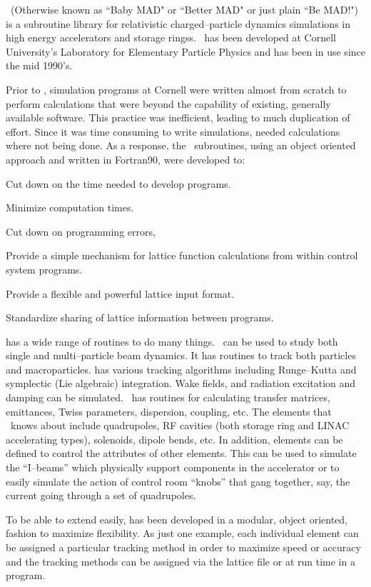 
\bmad\ (Otherwise known as ``Baby MAD" or ``Better MAD" or just plain
``Be MAD!")  is a subroutine library for relativistic
charged--particle dynamics simulations in high energy accelerators and
storage ringss. \bmad\ has been developed at Cornell University's
Laboratory for Elementary Particle Physics and has been in use since
the mid 1990's. 

Prior to \bmad, simulation programs at Cornell were written almost from 
scratch to perform
calculations that were beyond the capability of existing, generally
available software. This practice was inefficient, leading to much
duplication of effort.  Since it was time consuming to write
simulations, needed calculations where not being done.  As a response,
the \bmad\ subroutines, using an object oriented approach and written
in Fortran90, were developed to:
\begin{Itemize}
\item Cut down on the time needed to develop programs.
\item Minimize computation times.
\item Cut down on programming errors, 
\item Provide a simple mechanism for lattice function calculations
from within control system programs.
\item Provide a flexible and powerful lattice input format.
\item Standardize sharing of lattice information between 
programs.
\end{Itemize}

\bmad has a wide range of routines to do many things.  \bmad\ can be
used to study both single and multi--particle beam dynamics.  It has
routines to track both particles and macroparticles. \bmad has various
tracking algorithms including Runge--Kutta and symplectic (Lie
algebraic) integration.  Wake fields, and radiation excitation and
damping can be simulated. \bmad\ has routines for calculating transfer
matrices, emittances, Twiss parameters, dispersion, coupling, etc. The
elements that \bmad\ knows about include quadrupoles, RF cavities
(both storage ring and LINAC accelerating types), solenoids, dipole
bends, etc. In addition, elements can be defined to control the
attributes of other elements. This can be used to simulate the
``I--beams'' which physically support components in the accelerator
 or to easily simulate the action of control room ``knobs''
that gang together, say, the current going through a set of quadrupoles.

To be able to extend \bmad easily, \bmad has been developed
in a modular, object oriented, fashion to maximize flexibility. As just one 
example, each individual element can be assigned a particular tracking method
in order to maximize speed or accuracy and the tracking methods can be assigned
via the lattice file or at run time in a program.


\vfill
\break
